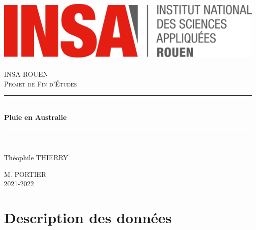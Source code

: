 \documentclass{article}
\begin{document}
\newcommand{\HRule}{\rule{\linewidth}{0.5mm}}

\begin{titlepage}
  \begin{sffamily}
  \begin{center}
    \hfill
    \includegraphics[scale=0.06]{./Images/logoINSARouen.png}~\\[1.5cm]

    \textsc{\LARGE INSA ROUEN}\\[1cm]

    \textsc{\Large Projet de Fin d'Études}\\[1cm]

    \HRule \\[0.4cm]
    { \huge \bfseries Pluie en Australie\\[0.4cm] }

    \HRule \\[1cm]

    \begin{minipage}{0.4\textwidth}
      \begin{flushleft} \large
        Théophile THIERRY\\
      \end{flushleft}
    \end{minipage}
    \begin{minipage}{0.4\textwidth}
      \begin{flushright} \large
        \textsc{M. PORTIER}\\
         2021-2022\\
      \end{flushright}
    \end{minipage}

    \vfill

  \end{center}
  \end{sffamily}
\end{titlepage}

\tableofcontents
\newpage

\part{Description des données}
\end{document}
